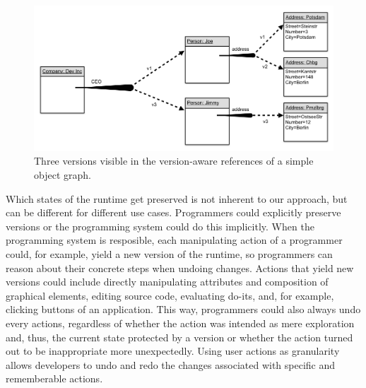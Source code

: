 \begin{figure}[h]
    \centering
    \includegraphics[width=\textwidth]{figures/4_approach/multipleVersionAwareReferences.png}
    \caption{Three versions visible in the version-aware references of a simple object graph.}
    \label{fig:MoreVersionAwareReferences}
\end{figure}



Which states of the runtime get preserved is not inherent to our approach, but can be different for different use cases. %
Programmers could explicitly preserve versions or the programming system could do this implicitly.
When the programming system is resposible, each manipulating action of a programmer could, for example, yield a new version of the runtime, so programmers can reason about their concrete steps when undoing changes.
Actions that yield new versions could include directly manipulating attributes and composition of graphical elements, editing source code, evaluating do-its, and, for example, clicking buttons of an application.
This way, programmers could also always undo every actions, regardless of whether the action was intended as mere exploration and, thus, the current state protected by a version or whether the action turned out to be inappropriate more unexpectedly.
Using user actions as granularity allows developers to undo and redo the changes associated with specific and rememberable actions.





